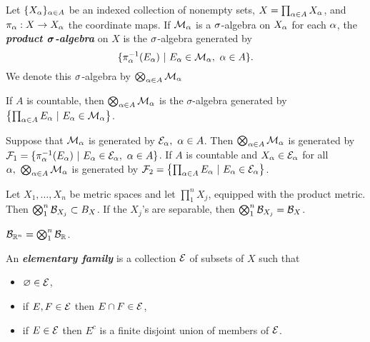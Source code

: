 \vs

\dfn Let $\{X_\alpha\}_{\alpha\in A}$ be an indexed collection of nonempty sets, $X = \prod_{\alpha\in A} X_\alpha$, and $\pi_\alpha:X\rightarrow X_\alpha$ the coordinate maps. If $\mathcal{M}_\alpha$ is a $\sigma$-algebra on $X_\alpha$ for each $\alpha$, the \textbf{\textit{product $\boldsymbol{\sigma}$-algebra}} on $X$ is the $\sigma$-algebra generated by 
\[\{\pi_\alpha^{-1}(E_\alpha)\ |\ E_\alpha \in \mathcal{M}_\alpha,\ \alpha\in A\}.\]
We denote this $\sigma$-algebra by $\bigotimes_{\alpha\in A}\mathcal{M}_\alpha$\\

\begin{prop}
If $A$ is countable, then $\bigotimes_{\alpha\in A}\mathcal{M}_\alpha$ is the $\sigma$-algebra generated by $\left\{\prod_{\al\in A} E_\al \ |\ E_\al \in \MM_\al \right\}$.
\end{prop}

\vs

\begin{prop}
Suppose that $\mathcal{M}_\alpha$ is generated by $\mathcal{E}_\alpha,\ \alpha\in A$. Then $\bigotimes_{\alpha\in A}\mathcal{M}_\alpha$ is generated by $\mathcal{F}_1 = \{\pi_\alpha^{-1}(E_\alpha)\ |\ E_\alpha \in \mathcal{E}_\alpha,\ \alpha \in A\}$. If $A$ is countable and $X_\alpha\in \mathcal{E}_\alpha$ for all $\alpha,\ \bigotimes_{\alpha\in A}\mathcal{M}_\alpha$ is generated by $\mathcal{F}_2 = \left\{\prod_{\alpha\in A} E_\alpha\ |\ E_\alpha \in \mathcal{E}_\alpha\right\}$.
\end{prop}

\vs 

\begin{prop}
Let $X_1,\ldots, X_n$ be metric spaces and let $\prod_1^n X_j$, equipped with the product metric. Then $\bigotimes_1^n \mathcal{B}_{X_j} \subset B_X$. If the $X_j$'s are separable, then $\bigotimes_1^n \mathcal{B}_{X_j} = \mathcal{B}_X$.
\end{prop}

\vs 

\begin{cor}
$\mathcal{B}_{\mathbb{R}^n} = \bigotimes_1^n \mathcal{B}_{\mathbb{R}}$.
\end{cor}

\vs 
\dfn An \textbf{\textit{elementary family}} is a collection $\mathcal{E}$ of subsets of $X$ such that
\begin{itemize}
\item $\varnothing\in \mathcal{E}$,
\item if $E,F\in \mathcal{E}$ then $E\cap F\in \mathcal{E}$,
\item if $E\in \mathcal{E}$ then $E^c$ is a finite disjoint union of members of $\mathcal{E}$.
\end{itemize}

\vs 

